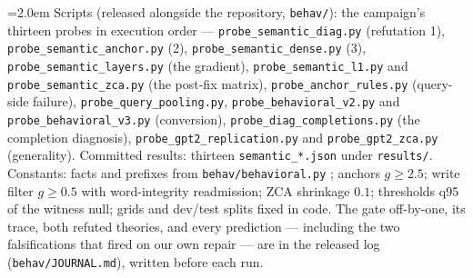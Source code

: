 \documentclass[11pt]{article}
\begin{document}
\begingroup\raggedright\emergencystretch=2.0em
Scripts (released alongside the repository, \texttt{behav/}): the campaign's thirteen probes in execution order --- \texttt{probe\_semantic\_diag.py} (refutation 1), \texttt{probe\_semantic\_anchor.py} (2), \texttt{probe\_semantic\_dense.py} (3), \texttt{probe\_semantic\_layers.py} (the gradient), \texttt{probe\_semantic\_l1.py} and \texttt{probe\_semantic\_zca.py} (the post-fix matrix), \texttt{probe\_anchor\_rules.py} (query-side failure), \texttt{probe\_query\_pooling.py}, \texttt{probe\_behavioral\_v2.py} and \texttt{probe\_behavioral\_v3.py} (conversion), \texttt{probe\_diag\_completions.py} (the completion diagnosis), \texttt{probe\_gpt2\_replication.py} and \texttt{probe\_gpt2\_zca.py} (generality). Committed results: thirteen \texttt{semantic\_*.json} under \texttt{results/}. Constants: facts and prefixes from \texttt{behav/behavioral.py} \cite{behavior}; anchors $g \geq 2.5$; write filter $g \geq 0.5$ with word-integrity readmission; ZCA shrinkage $0.1$; thresholds q95 of the witness null; grids and dev/test splits fixed in code. The gate off-by-one, its trace, both refuted theories, and every prediction --- including the two falsifications that fired on our own repair --- are in the released log (\texttt{behav/JOURNAL.md}), written before each run.\par\endgroup
\end{document}
